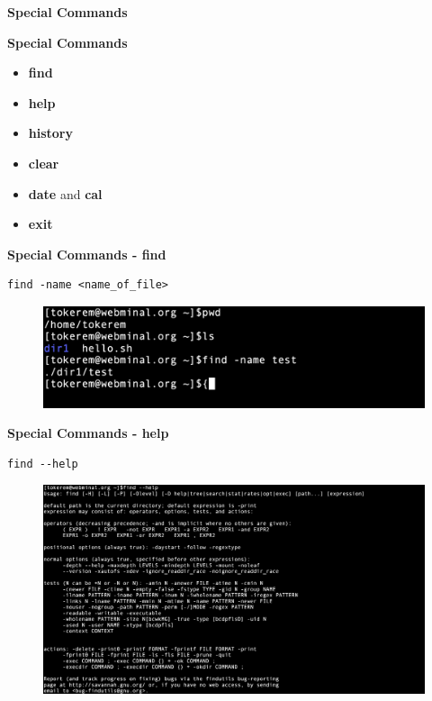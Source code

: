 \documentclass[ignorenonframetext,]{beamer}
\begin{document}
\begin{frame}[fragile]{\textbf{Special Commands}}

\begin{block}{\textbf{Special Commands}}

\begin{itemize}
\item
  \textbf{{\textbf{find}}}
\item
  \textbf{{\textbf{help}}}
\item
  \textbf{{\textbf{history}}}
\item
  \textbf{{\textbf{clear}}}
\item
  \textbf{{\textbf{date}}} and \textbf{{\textbf{cal}}}
\item
  \textbf{{\textbf{exit}}}
\end{itemize}

\end{block}

\begin{block}{\textbf{Special Commands - {\textbf{find}}}}

\begin{verbatim}
find -name <name_of_file>
\end{verbatim}

\begin{figure}
\centering
\includegraphics{find.png}
\caption{}
\end{figure}

\end{block}

\begin{block}{\textbf{Special Commands - {\textbf{help}}}}

\begin{verbatim}
find --help
\end{verbatim}

\begin{figure}
\centering
\includegraphics{help.png}
\caption{}
\end{figure}


\end{block}
\end{frame}
\end{document}

